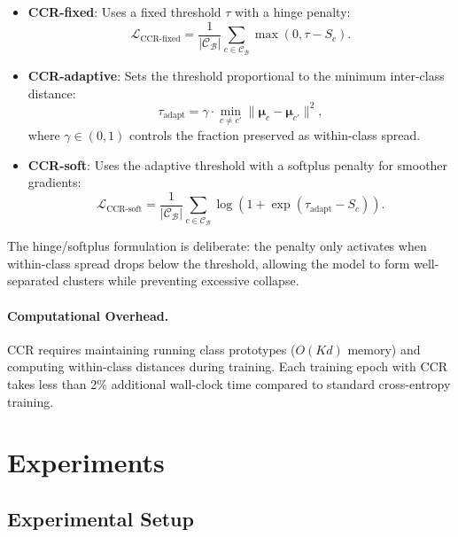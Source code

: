 \documentclass{article}
\newcommand{\loss}{\mathcal{L}}
\begin{document}
\begin{itemize}
    \item \textbf{CCR-fixed}: Uses a fixed threshold $\tau$ with a hinge penalty:
    \begin{equation}
        \loss_{\text{CCR-fixed}} = \frac{1}{|\mathcal{C}_\mathcal{B}|} \sum_{c \in \mathcal{C}_\mathcal{B}} \max(0, \tau - S_c).
    \end{equation}

    \item \textbf{CCR-adaptive}: Sets the threshold proportional to the minimum inter-class distance:
    \begin{equation}
        \tau_{\text{adapt}} = \gamma \cdot \min_{c \neq c'} \|\boldsymbol{\mu}_c - \boldsymbol{\mu}_{c'}\|^2,
    \end{equation}
    where $\gamma \in (0, 1)$ controls the fraction preserved as within-class spread.

    \item \textbf{CCR-soft}: Uses the adaptive threshold with a softplus penalty for smoother gradients:
    \begin{equation}
        \loss_{\text{CCR-soft}} = \frac{1}{|\mathcal{C}_\mathcal{B}|} \sum_{c \in \mathcal{C}_\mathcal{B}} \log(1 + \exp(\tau_{\text{adapt}} - S_c)).
    \end{equation}
\end{itemize}

The hinge/softplus formulation is deliberate: the penalty only activates when within-class spread drops below the threshold, allowing the model to form well-separated clusters while preventing excessive collapse.

\paragraph{Computational Overhead.}
CCR requires maintaining running class prototypes ($O(Kd)$ memory) and computing within-class distances during training. Each training epoch with CCR takes less than 2\% additional wall-clock time compared to standard cross-entropy training.

\section{Experiments}
\label{sec:experiments}

\subsection{Experimental Setup}
\end{document}
